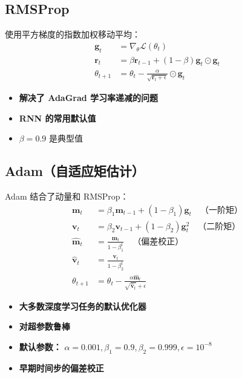\subsection{RMSProp}

使用平方梯度的指数加权移动平均：
\begin{align}
\mathbf{g}_t &= \nabla_\theta \mathcal{L}(\theta_t) \\
\mathbf{r}_t &= \beta \mathbf{r}_{t-1} + (1-\beta)\mathbf{g}_t \odot \mathbf{g}_t \\
\theta_{t+1} &= \theta_t - \frac{\alpha}{\sqrt{\mathbf{r}_t + \epsilon}} \odot \mathbf{g}_t
\end{align}

\begin{itemize}
    \item \textbf{解决了 AdaGrad 学习率递减的问题}
    \item \textbf{RNN 的常用默认值}
    \item $\beta = 0.9$ 是典型值
\end{itemize}

\subsection{Adam（自适应矩估计）}

Adam \cite{kingma2014adam} 结合了动量和 RMSProp：
\begin{align}
\mathbf{m}_t &= \beta_1 \mathbf{m}_{t-1} + (1-\beta_1)\mathbf{g}_t \quad \text{（一阶矩）} \\
\mathbf{v}_t &= \beta_2 \mathbf{v}_{t-1} + (1-\beta_2)\mathbf{g}_t^2 \quad \text{（二阶矩）} \\
\hat{\mathbf{m}}_t &= \frac{\mathbf{m}_t}{1-\beta_1^t} \quad \text{（偏差校正）} \\
\hat{\mathbf{v}}_t &= \frac{\mathbf{v}_t}{1-\beta_2^t} \\
\theta_{t+1} &= \theta_t - \frac{\alpha \hat{\mathbf{m}}_t}{\sqrt{\hat{\mathbf{v}}_t} + \epsilon}
\end{align}

\begin{properties}
\begin{itemize}
    \item \textbf{大多数深度学习任务的默认优化器}
    \item \textbf{对超参数鲁棒}
    \item \textbf{默认参数：} $\alpha = 0.001, \beta_1 = 0.9, \beta_2 = 0.999, \epsilon = 10^{-8}$
    \item \textbf{早期时间步的偏差校正}
\end{itemize}
\end{properties}

